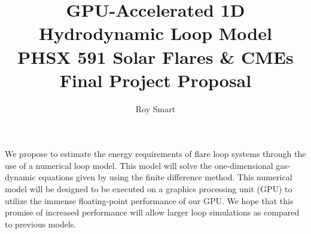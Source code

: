 \documentclass[10pt,letterpaper]{article}
\author{Roy Smart}
\title{GPU-Accelerated 1D Hydrodynamic Loop Model \\ PHSX 591 Solar Flares \& CMEs \\ Final Project Proposal}
\begin{document}
	
	\maketitle
	
	We propose to estimate the energy requirements of flare loop systems through the use of a numerical loop model. This model will solve the one-dimensional gas-dynamic equations given by \cite{2014ApJ...795...10L} using the finite difference method. This numerical model will be designed to be executed on a graphics processing unit (GPU) to utilize the immense floating-point performance of our GPU. We hope that this promise of increased performance will allow larger loop simulations as compared to previous models.
	
	\printbibliography
	
\end{document}

